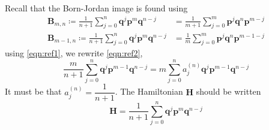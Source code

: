 \documentclass[a4paper]{article}
\theoremstyle{definition}
\begin{document}
		Recall that the Born-Jordan image is found using
		\begin{align}
			\textbf{B}_{m,n}\coloneqq\frac{1}{n+1}\sum_{j=0}^n\textbf{q}^j\textbf{p}^m\textbf{q}^{n-j}&=\frac{1}{m+1}\sum_{j=0}^{m}\textbf{p}^j\textbf{q}^n\textbf{p}^{m-j} \\
			\textbf{B}_{m-1,n}\coloneqq\frac{1}{n+1}\sum_{j=0}^n\textbf{q}^j\textbf{p}^m\textbf{q}^{n-j}&=\frac{1}{m}\sum_{j=0}^{m}\textbf{p}^j\textbf{q}^n\textbf{p}^{m-1-j} \label{eqn:ref1}
		\end{align}
		using \ref{eqn:ref1}, we rewrite \ref{eqn:ref2},
		\begin{equation}
			\frac{m}{n+1}\sum_{j=0}^{n}\textbf{q}^j\textbf{p}^{m-1}\textbf{q}^{n-j}\label{eqn:ref2}=m\sum_{j=0}^{n}a_j^{(n)}\textbf{q}^j\textbf{p}^{m-1}\textbf{q}^{n-j}
		\end{equation}
		It must be that $a_j^{(n)}=\dfrac{1}{n+1}$. The Hamiltonian $\textbf{H}$ should be written
		\begin{equation}
			\textbf{H}=\frac{1}{n+1}\sum_{j=0}^n\textbf{q}^j\textbf{p}^m\textbf{q}^{n-j}
		\end{equation}
		
\end{document}
